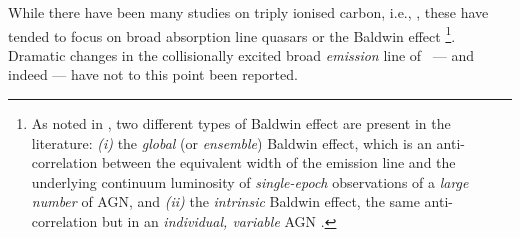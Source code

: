 \documentclass[fleqn,usenatbib]{mnras}
\begin{document}
While there have been many studies on triply ionised carbon, i.e.,
\civ, these have tended to focus on broad absorption line quasars
\citep[e.g., Table 1 of][]{Hemler2019} or the Baldwin effect
\citep{Baldwin1977, Bian2012, Jensen2016,
Hamann2017}\footnote{As noted in \citet{Rakic2017}, two different
types of Baldwin effect are present in the literature: {\it (i)} the {\it
global} (or {\it ensemble}) Baldwin effect, which is an
anti-correlation between the equivalent width of the emission line and the
underlying continuum luminosity of {\it single-epoch} observations of
a {\it large number} of AGN, and {\it (ii)} the {\it intrinsic} Baldwin
effect, the same anti-correlation but in an {\it individual, variable}
AGN \citep{PoggePeterson1992}.}.  Dramatic changes in the
collisionally excited broad {\it emission} line of \civ\ --- and
indeed \ciii --- have not to this point been reported.
\end{document}
